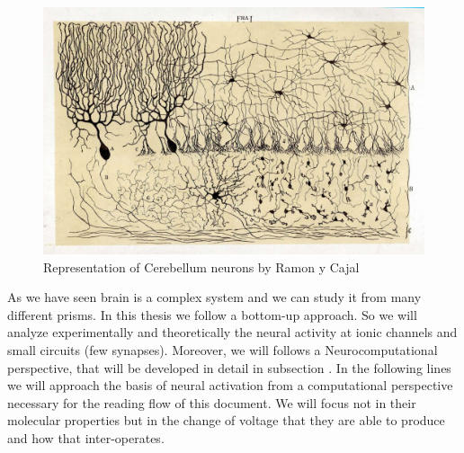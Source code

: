 \begin{figure}[htb!]
    \centering
    \includegraphics[width=\textwidth]{img/intro/CajalCerebellum.jpeg}
    \caption{Representation of Cerebellum neurons by Ramon y Cajal}
    \label{cajal-neuron}
\end{figure}


As we have seen brain is a complex system and we can study it from many different prisms. In this thesis we follow a bottom-up approach. So we will analyze experimentally and theoretically the neural activity at ionic channels and small circuits (few synapses). Moreover, we will follows a Neurocomputational perspective, that will be developed in detail in subsection \label{computational neuroscience}. In the following lines we will approach the basis of neural activation from a computational perspective necessary for the reading flow of this document. We will focus not in their molecular properties but in the change of voltage that they are able to produce and how that inter-operates. 

